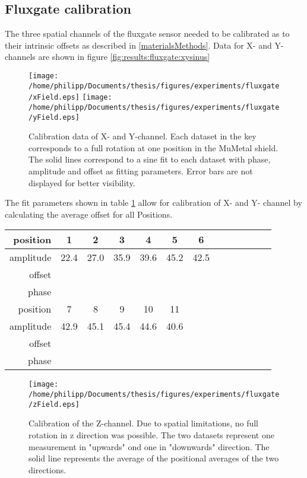 	\subsection{Fluxgate calibration}
	The three spatial channels of the fluxgate sensor needed to be calibrated as to their intrinsic offsets as described in \ref{materialsMethods}. Data for X- and Y-channels are shown in figure \ref{fig:results:fluxgate:xysinus}
		\begin{figure}[h]
			\label{fig:results:fluxgate:ysinus}
			\centering
			\texttt{[image: /home/philipp/Documents/thesis/figures/experiments/fluxgate/xField.eps]}
			\texttt{[image: /home/philipp/Documents/thesis/figures/experiments/fluxgate/yField.eps]}
			\caption{Calibration data of X- and Y-channel. Each dataset in the key corresponds to a full rotation at one position in the MuMetal shield. The solid lines correspond to a sine fit to each dataset with phase, amplitude and offset as fitting parameters. Error bars are not displayed for better visibility.}
		\end{figure}
		The fit parameters shown in table \ref{table:results:calibrationFitParams} allow for calibration of X- and Y- channel by calculating the average offset for all Positions.
		\begin{table}
			\centering
			\label{table:results:calibrationFitParams}
			\begin{tabular}{r|cccccccccccc}
				\label{table:results:calibrationFitParams}
				position & 1& 2 & 3 & 4 & 5 & 6\\
				\hline
				amplitude & 22.4 & 27.0 & 35.9 & 39.6 & 45.2 & 42.5\\ 
				offset \\
				phase \\
				\hline
				position & 7 & 8 & 9 & 10 & 11 \\
				\hline
				amplitude & 42.9 & 45.1 & 45.4 & 44.6 & 40.6\\
				offset \\
				phase
			\end{tabular}
		\end{table}
		\begin{figure}[h]
			\label{fig:results:fluxgate:zcal}
			\centering
			\texttt{[image: /home/philipp/Documents/thesis/figures/experiments/fluxgate/zField.eps]}
			\caption{Calibration of the Z-channel. Due to spatial limitations, no full rotation in z direction was possible. The two datasets represent one measurement in "upwards" ond one in "downwards" direction. The solid line represents the average of the positional averages of the two directions.}
		\end{figure}
